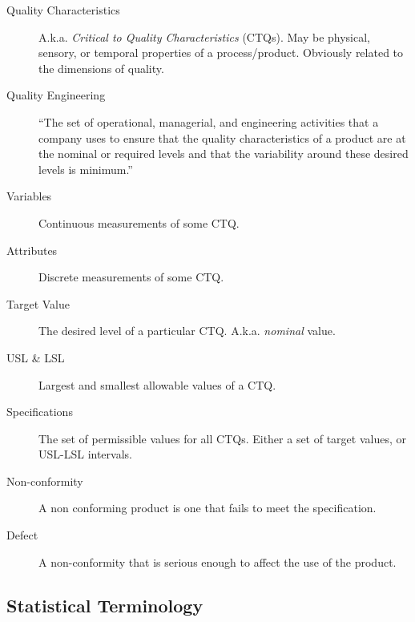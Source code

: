 \documentclass[12pt,a4paper]{report}
\begin{document}
\begin{description}
\item [Quality Characteristics] A.k.a. \emph{Critical to Quality Characteristics} (CTQs). May be physical, sensory, or temporal properties of a process/product. Obviously related to the dimensions of quality. 

\item [Quality Engineering] ``The set of operational, managerial, and engineering activities
that a company uses to ensure that the quality characteristics of a product are at the nominal
or required levels and that the variability around these desired levels is minimum.'' \citep{montgomery_introduction_2007}
\item [Variables] Continuous measurements of some CTQ.
\item [Attributes] Discrete measurements of some CTQ.
\item [Target Value] The desired level of a particular CTQ. A.k.a. \emph{nominal} value. 
\item [USL \& LSL] Largest and smallest allowable values of a CTQ.
\item [Specifications] The set of permissible values for all CTQs. Either a set of target values, or USL-LSL intervals. 
\item [Non-conformity] A non conforming product is one that fails to meet the specification.
\item [Defect] A non-conformity that is serious enough to affect the use of the product.
\end{description}




\subsection{Statistical Terminology}
\end{document}
